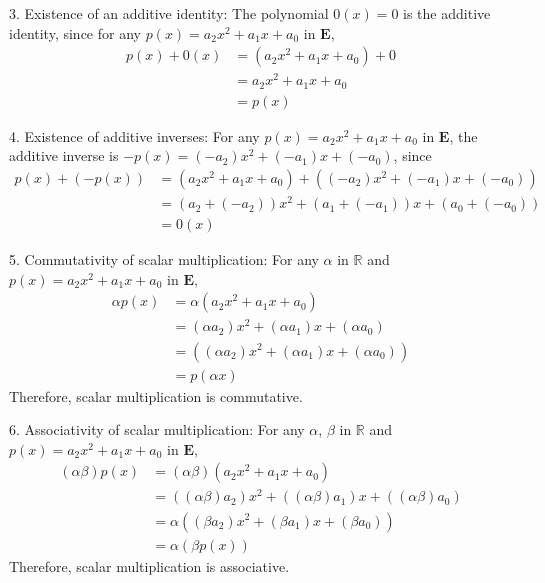\documentclass{article}
\begin{document}
3. Existence of an additive identity: The polynomial $0(x) = 0$ is the additive identity, since for any $p(x) = a_2 x^2 + a_1 x + a_0$ in $\mathbf{E}$,
\begin{align*}
    p(x) + 0(x) & = (a_2 x^2 + a_1 x + a_0) + 0 \\
                & = a_2 x^2 + a_1 x + a_0       \\
                & = p(x)
\end{align*}

4. Existence of additive inverses: For any $p(x) = a_2 x^2 + a_1 x + a_0$ in $\mathbf{E}$, the additive inverse is $-p(x) = (-a_2) x^2 + (-a_1) x + (-a_0)$, since
\begin{align*}
    p(x) + (-p(x)) & = (a_2 x^2 + a_1 x + a_0) + ((-a_2) x^2 + (-a_1) x + (-a_0)) \\
                   & = (a_2 + (-a_2)) x^2 + (a_1 + (-a_1)) x + (a_0 + (-a_0))     \\
                   & = 0(x)
\end{align*}

5. Commutativity of scalar multiplication: For any $\alpha$ in $\mathbb{R}$ and $p(x) = a_2 x^2 + a_1 x + a_0$ in $\mathbf{E}$,
\begin{align*}
    \alpha p(x) & = \alpha (a_2 x^2 + a_1 x + a_0)                     \\
                & = (\alpha a_2) x^2 + (\alpha a_1) x + (\alpha a_0)   \\
                & = ((\alpha a_2) x^2 + (\alpha a_1) x + (\alpha a_0)) \\
                & = p(\alpha x)
\end{align*}
Therefore, scalar multiplication is commutative.

6. Associativity of scalar multiplication: For any $\alpha$, $\beta$ in $\mathbb{R}$ and $p(x) = a_2 x^2 + a_1 x + a_0$ in $\mathbf{E}$,
\begin{align*}
    (\alpha \beta) p(x) & = (\alpha \beta) (a_2 x^2 + a_1 x + a_0)                                   \\
                        & = ((\alpha \beta) a_2) x^2 + ((\alpha \beta) a_1) x + ((\alpha \beta) a_0) \\
                        & = \alpha ((\beta a_2) x^2 + (\beta a_1) x + (\beta a_0))                   \\
                        & = \alpha (\beta p(x))
\end{align*}
Therefore, scalar multiplication is associative.
\end{document}
